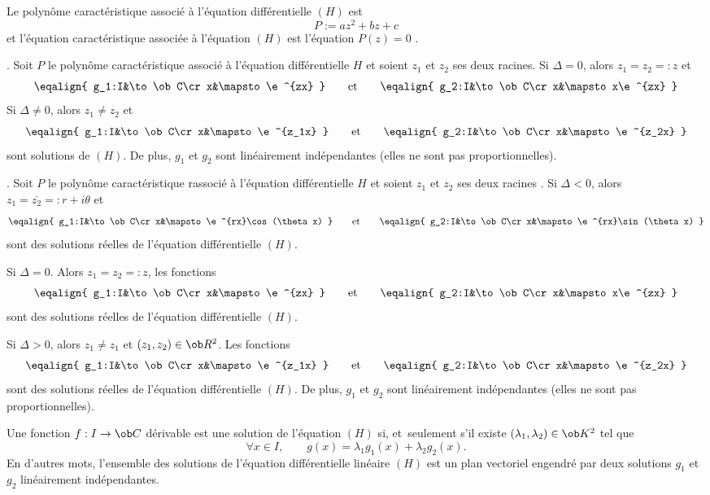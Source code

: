 \Definition []  Le polyn\^ome caract\'eristique associ\'e \`a l'\'equation diff\'erentielle $(H)$ est 
$$
P:=az^2+bz+c
$$
et l'\'equation caract\'eristique  associ\'ee \`a l'\'equation $(H)$ est l'\'equation  $P(z)=0$ . 
\bigskip

. Soit $P$ le polyn\^ome caract\'eristique associ\'e \`a l'\'equation dif\-f\'e\-ren\-tiel\-le $H$ et soient $z_1$ et $z_2$ ses deux racines. 
\medskip
\noindent
Si $\Delta=0$, alors $z_1=z_2=:z$ et 
$$
\eqalign{
	g_1:I&\to\ob C\cr
	x&\mapsto\e^{zx}
}
\qquad\mbox{et}\qquad 
\eqalign{
	g_2:I&\to\ob C\cr
	x&\mapsto x\e^{zx}
	}
$$ 
Si $\Delta\neq0$, alors $z_1\neq z_2$ et 
$$
\eqalign{
	g_1:I&\to\ob C\cr
	x&\mapsto\e^{z_1x}
}
\qquad\mbox{et}\qquad 
\eqalign{
	g_2:I&\to\ob C\cr
	x&\mapsto\e^{z_2x}
	}
$$ 
 sont solutions de $(H)$.
\medskip\noindent
De plus, $g_1$ et $g_2$ sont lin\'eairement ind\'ependantes (elles ne sont pas proportionnelles). 
\bigskip


. 
Soit $P$ le polyn\^ome caract\'eristique rassoci\'e \`a l'\'equation  dif\-f\'e\-ren\-tiel\-le   $H$   et  
soient  $z_1$  et  $z_2$  ses  deux  racines .  \medskip  \noindent Si  $\Delta<0$,  alors
$z_1=\overline{z_2}=:r+i\theta$            
                                                                                et
$$
\eqalign{
	g_1:I&\to\ob C\cr
	x&\mapsto\e^{rx}\cos(\theta x)
}
\qquad\mbox{et}\qquad 
\eqalign{
	g_2:I&\to\ob C\cr
	x&\mapsto\e^{rx}\sin(\theta x)
	}
$$ 
sont des solutions r\'eelles de l'\'equation diff\'erentielle $(H)$.  \medskip

\noindent Si $\Delta=0$. Alors $z_1=z_2=:z$, les fonctions
$$
\eqalign{
	g_1:I&\to\ob C\cr
	x&\mapsto\e^{zx}
}\qquad\mbox{et}\qquad 
\eqalign{
	g_2:I&\to\ob C\cr
	x&\mapsto x\e^{zx}
	}
$$   sont des solutions r\'eelles de l'\'equation diff\'erentielle $(H)$. 
\medskip

\noindent
Si $\Delta>0$, alors $z_1 \neq z_1$ et $(z_1,z_2)\in\ob R^2$. Les fonctions 
$$
\eqalign{
	g_1:I&\to\ob C\cr
	x&\mapsto\e^{z_1x}
}
\qquad\mbox{et}\qquad 
\eqalign{
	g_2:I&\to\ob C\cr
	x&\mapsto\e^{z_2x}
	}
$$ 
 sont des solutions r\'eelles de l'\'equation diff\'erentielle $(H)$. 
\medskip\noindent
De plus, $g_1$ et $g_2$ sont lin\'eairement ind\'ependantes (elles ne sont pas proportionnelles). 
\bigskip


\Theoreme  Une fonction $f:I\to\ob C$ d\'erivable est une solution de l'\'equation $(H)$ si, et~seulement s'il existe $(\lambda_1,\lambda_2)\in\ob K^2$ tel que 
$$
\forall x\in I ,\qquad  g(x)=\lambda_1g_1(x)+\lambda_2g_2(x) .
$$
En d'autres mots, l'ensemble des solutions de l'\'equation diff\'erentielle lin\'eaire $(H)$ est un plan vectoriel 
engendr\'e par deux solutions $g_1$ et $g_2$ lin\'eairement ind\'ependantes. 
\bigskip


